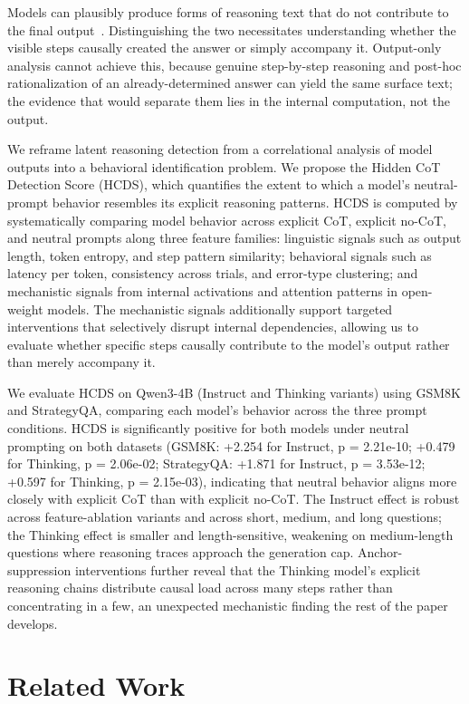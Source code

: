 \documentclass{article}
\theoremstyle{plain}
\theoremstyle{definition}
\theoremstyle{remark}
\begin{document}
Models can plausibly produce forms of reasoning text that do not contribute to the final output~\citep{turpin_language_2023}. Distinguishing the two necessitates understanding whether the visible steps causally created the answer or simply accompany it. Output-only analysis cannot achieve this, because genuine step-by-step reasoning and post-hoc rationalization of an already-determined answer can yield the same surface text; the evidence that would separate them lies in the internal computation, not the output.

We reframe latent reasoning detection from a correlational analysis of model outputs into a behavioral identification problem. We propose the Hidden CoT Detection Score (HCDS), which quantifies the extent to which a model's neutral-prompt behavior resembles its explicit reasoning patterns. HCDS is computed by systematically comparing model behavior across explicit CoT, explicit no-CoT, and neutral prompts along three feature families: linguistic signals such as output length, token entropy, and step pattern similarity; behavioral signals such as latency per token, consistency across trials, and error-type clustering; and mechanistic signals from internal activations and attention patterns in open-weight models. The mechanistic signals additionally support targeted interventions that selectively disrupt internal dependencies, allowing us to evaluate whether specific steps causally contribute to the model's output rather than merely accompany it.

We evaluate HCDS on Qwen3-4B (Instruct and Thinking variants) using GSM8K and StrategyQA, comparing each model's behavior across the three prompt conditions. HCDS is significantly positive for both models under neutral prompting on both datasets (GSM8K: +2.254 for Instruct, p = 2.21e-10; +0.479 for Thinking, p = 2.06e-02; StrategyQA: +1.871 for Instruct, p = 3.53e-12; +0.597 for Thinking, p = 2.15e-03), indicating that neutral behavior aligns more closely with explicit CoT than with explicit no-CoT. The Instruct effect is robust across feature-ablation variants and across short, medium, and long questions; the Thinking effect is smaller and length-sensitive, weakening on medium-length questions where reasoning traces approach the generation cap. Anchor-suppression interventions further reveal that the Thinking model's explicit reasoning chains distribute causal load across many steps rather than concentrating in a few, an unexpected mechanistic finding the rest of the paper develops.


\section{Related Work}
\end{document}

